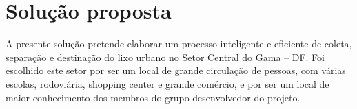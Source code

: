\section{Solução proposta}

A presente solução pretende elaborar um processo inteligente
e eficiente de coleta, separação e destinação do lixo urbano no
Setor Central do Gama – DF. Foi escolhido este setor por ser um
local de grande circulação de pessoas, com várias escolas,
rodoviária, shopping center e grande comércio, e por ser um local
de maior conhecimento dos membros do grupo desenvolvedor do projeto. 
